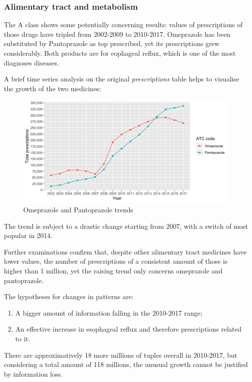 \subsubsection{Alimentary tract and metabolism}
The A class shows some potentially concerning results: values of prescriptions of those drugs have tripled from 2002-2009 to 2010-2017. Omeprazole has been substituted by Pantoprazole as top prescribed, yet its prescriptions grew considerably. Both products are for eophageal reflux, which is one of the most diagnoses diseases.

A brief time series analysis on the original \textit{prescriptions} table helps to visualise the growth of the two medicines:
\begin{figure}[h]
	\centering
	\includegraphics[scale=0.3]{../plots/atc-a-gastro.png}
	\caption{\small Omeprazole and Pantoprazole trends}
\end{figure}

The trend is subject to a drastic change starting from 2007, with a switch of most popular in 2014.

Further examinations confirm that, despite other alimentary tract medicines have lower values, the number of prescriptions of a consistent amount of those is higher than 1 million, yet the raising trend only concerns omeprazole and pantoprazole. 

The hypotheses for changes in patterns are:
\begin{enumerate}
	\item A bigger amount of information falling in the 2010-2017 range;
	\item An effective increase in esophageal reflux and therefore prescriptions related to it.
\end{enumerate}

There are approximatively 18 more millions of tuples overall in 2010-2017, but considering a total amount of 118 millions, the unusual growth cannot be justified by information loss.

